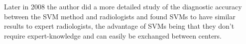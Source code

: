\documentclass[11pt,a4paper,oneside]{report}
\begin{document}
Later in 2008 the author did a more detailed study of the diagnostic accuracy between the SVM method and radiologists and found SVMs to have similar results to expert radiologists, the advantage of SVMs being that they don't require expert-knowledge and can easily be exchanged between centers. \cite{kloppel2008accuracy} 


\nocite{*} %


\end{document}
